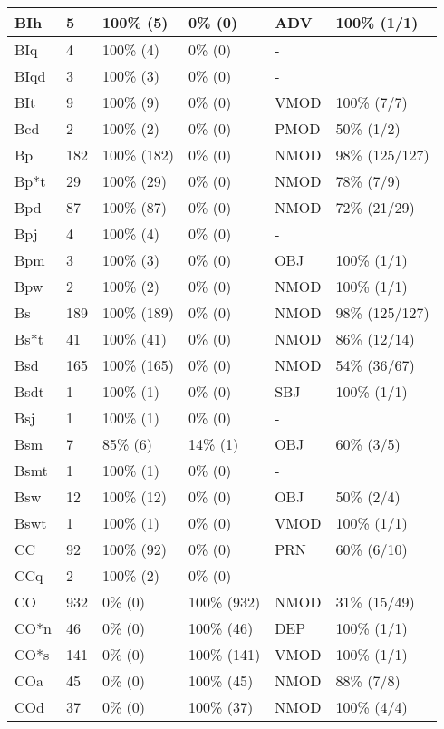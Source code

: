 \begin{figure*}
\begin{tabular}{|l|l|l|l||l|l|}
 BIh & 5 & 100\% (5) & 0\% (0) & ADV & 100\% (1/1) \\ 
\hline
 BIq & 4 & 100\% (4) & 0\% (0) & - &  \\ 
\hline
 BIqd & 3 & 100\% (3) & 0\% (0) & - &  \\ 
\hline
 BIt & 9 & 100\% (9) & 0\% (0) & VMOD & 100\% (7/7) \\ 
\hline
 Bcd & 2 & 100\% (2) & 0\% (0) & PMOD & 50\% (1/2) \\ 
\hline
 Bp & 182 & 100\% (182) & 0\% (0) & NMOD & 98\% (125/127) \\ 
\hline
 Bp*t & 29 & 100\% (29) & 0\% (0) & NMOD & 78\% (7/9) \\ 
\hline
 Bpd & 87 & 100\% (87) & 0\% (0) & NMOD & 72\% (21/29) \\ 
\hline
 Bpj & 4 & 100\% (4) & 0\% (0) & - &  \\ 
\hline
 Bpm & 3 & 100\% (3) & 0\% (0) & OBJ & 100\% (1/1) \\ 
\hline
 Bpw & 2 & 100\% (2) & 0\% (0) & NMOD & 100\% (1/1) \\ 
\hline
 Bs & 189 & 100\% (189) & 0\% (0) & NMOD & 98\% (125/127) \\ 
\hline
 Bs*t & 41 & 100\% (41) & 0\% (0) & NMOD & 86\% (12/14) \\ 
\hline
 Bsd & 165 & 100\% (165) & 0\% (0) & NMOD & 54\% (36/67) \\ 
\hline
 Bsdt & 1 & 100\% (1) & 0\% (0) & SBJ & 100\% (1/1) \\ 
\hline
 Bsj & 1 & 100\% (1) & 0\% (0) & - &  \\ 
\hline
 Bsm & 7 & 85\% (6) & 14\% (1) & OBJ & 60\% (3/5) \\ 
\hline
 Bsmt & 1 & 100\% (1) & 0\% (0) & - &  \\ 
\hline
 Bsw & 12 & 100\% (12) & 0\% (0) & OBJ & 50\% (2/4) \\ 
\hline
 Bswt & 1 & 100\% (1) & 0\% (0) & VMOD & 100\% (1/1) \\ 
\hline
 CC & 92 & 100\% (92) & 0\% (0) & PRN & 60\% (6/10) \\ 
\hline
 CCq & 2 & 100\% (2) & 0\% (0) & - &  \\ 
\hline
 CO & 932 & 0\% (0) & 100\% (932) & NMOD & 31\% (15/49) \\ 
\hline
 CO*n & 46 & 0\% (0) & 100\% (46) & DEP & 100\% (1/1) \\ 
\hline
 CO*s & 141 & 0\% (0) & 100\% (141) & VMOD & 100\% (1/1) \\ 
\hline
 COa & 45 & 0\% (0) & 100\% (45) & NMOD & 88\% (7/8) \\ 
\hline
 COd & 37 & 0\% (0) & 100\% (37) & NMOD & 100\% (4/4) \\ 
\hline
\end{tabular}
\end{figure*}
